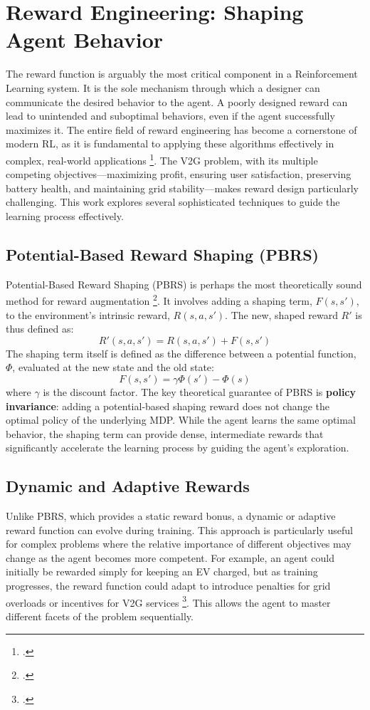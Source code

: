 \section{Reward Engineering: Shaping Agent Behavior}
\label{sec:reward_shaping}

The reward function is arguably the most critical component in a Reinforcement Learning system. It is the sole mechanism through which a designer can communicate the desired behavior to the agent. A poorly designed reward can lead to unintended and suboptimal behaviors, even if the agent successfully maximizes it. The entire field of reward engineering has become a cornerstone of modern RL, as it is fundamental to applying these algorithms effectively in complex, real-world applications \footcite{ibrahim2024comprehensive}. The V2G problem, with its multiple competing objectives—maximizing profit, ensuring user satisfaction, preserving battery health, and maintaining grid stability—makes reward design particularly challenging. This work explores several sophisticated techniques to guide the learning process effectively.

\subsection{Potential-Based Reward Shaping (PBRS)}
Potential-Based Reward Shaping (PBRS) is perhaps the most theoretically sound method for reward augmentation \footcite{ng1999policy}. It involves adding a shaping term, $F(s, s')$, to the environment's intrinsic reward, $R(s, a, s')$. The new, shaped reward $R'$ is thus defined as:
\[
R'(s, a, s') = R(s, a, s') + F(s, s')
\]
The shaping term itself is defined as the difference between a potential function, $\Phi$, evaluated at the new state and the old state:
\[
F(s, s') = \gamma \Phi(s') - \Phi(s)
\]
where $\gamma$ is the discount factor. The key theoretical guarantee of PBRS is \textbf{policy invariance}: adding a potential-based shaping reward does not change the optimal policy of the underlying MDP. While the agent learns the same optimal behavior, the shaping term can provide dense, intermediate rewards that significantly accelerate the learning process by guiding the agent's exploration.

\subsection{Dynamic and Adaptive Rewards}
Unlike PBRS, which provides a static reward bonus, a dynamic or adaptive reward function can evolve during training. This approach is particularly useful for complex problems where the relative importance of different objectives may change as the agent becomes more competent. For example, an agent could initially be rewarded simply for keeping an EV charged, but as training progresses, the reward function could adapt to introduce penalties for grid overloads or incentives for V2G services \footcite{wan2022dynamic}. This allows the agent to master different facets of the problem sequentially.

